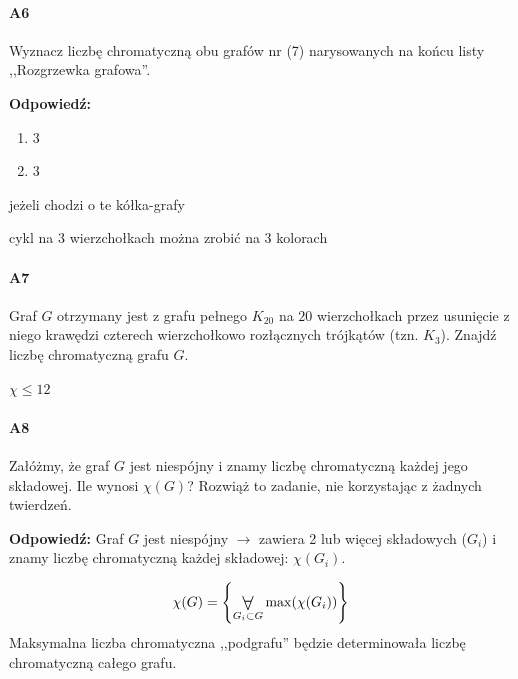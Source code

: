 \documentclass[a4paper,12pt]{article}
\theoremstyle{definition}%
\theoremstyle{definition}
\theoremstyle{problem}
\let\originalforall=\forall%
\renewcommand{\forall}{\mathop{\vcenter{\hbox{\Large$\originalforall$}}}}
\begin{document}
\paragraph{A6} Wyznacz liczbę chromatyczną obu grafów nr (7) narysowanych na końcu listy ,,Rozgrzewka grafowa''.

\textbf{Odpowiedź:} 
\begin{enumerate}[label=\alph*)]
\item 3
\item 3
\end{enumerate}
jeżeli chodzi o te kółka-grafy

cykl na 3 wierzchołkach można zrobić na 3 kolorach



\paragraph{A7} Graf $G$ otrzymany jest z grafu pełnego $K_{20}$ na $20$ wierzchołkach przez usunięcie z niego krawędzi czterech wierzchołkowo rozłącznych trójkątów (tzn. $K_3$). Znajdź liczbę chromatyczną grafu $G$.

$\chi \leq 12$

\paragraph{A8} Załóżmy, że graf $G$ jest niespójny i znamy liczbę chromatyczną każdej jego składowej. Ile wynosi $\chi (G)$?
Rozwiąż to zadanie, nie korzystając z żadnych twierdzeń.

\textbf{Odpowiedź:} 
Graf $G$ jest niespójny $\rightarrow $ zawiera 2 lub więcej składowych ($G_i$) i znamy liczbę chromatyczną każdej składowej: $\chi (G_i)$.

$$\chi (G) = \left\{\forall _{G_i \subset G} \max (\chi (G_i)) \right\}$$
Maksymalna liczba chromatyczna ,,podgrafu'' będzie determinowała liczbę chromatyczną całego grafu.
\end{document}
